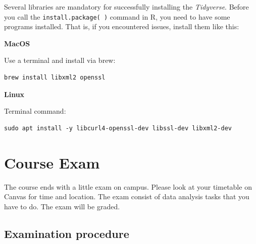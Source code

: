 \documentclass[
]{scrartcl}
\begin{document}
Several libraries are mandatory for successfully installing the \emph{Tidyverse}. Before you call the \texttt{install.package(\ )} command in R, you need to have some programs installed. That is, if you encountered issues, install them like this:

\textbf{MacOS}

Use a terminal and install via brew:

\begin{verbatim}
brew install libxml2 openssl
\end{verbatim}

\textbf{Linux}

Terminal command:

\begin{verbatim}
sudo apt install -y libcurl4-openssl-dev libssl-dev libxml2-dev
\end{verbatim}

\hypertarget{course-exam}{%
\section{Course Exam}\label{course-exam}}

The course ends with a little exam on campus. Please look at your timetable on Canvas for time and location. The exam consist of data analysis tasks that you have to do. The exam will be graded.

\hypertarget{examination-procedure}{%
\subsection*{Examination procedure}\label{examination-procedure}}
\end{document}
